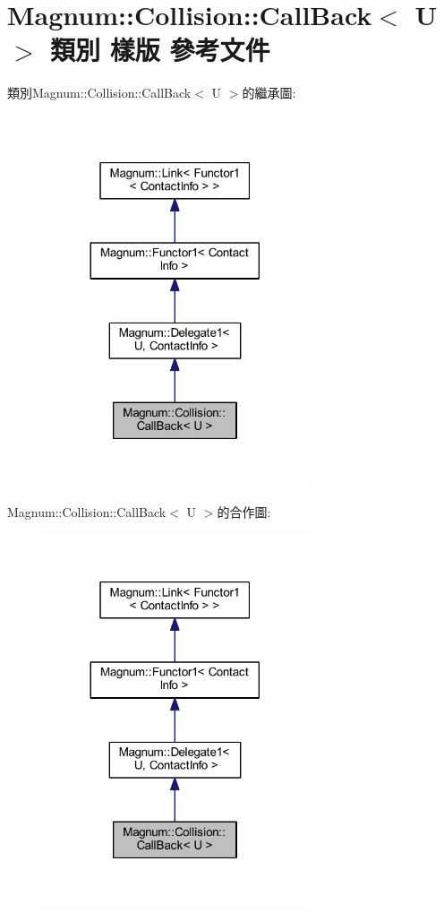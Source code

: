 \hypertarget{class_magnum_1_1_collision_1_1_call_back}{}\section{Magnum\+:\+:Collision\+:\+:Call\+Back$<$ U $>$ 類別 樣版 參考文件}
\label{class_magnum_1_1_collision_1_1_call_back}


類別\+Magnum\+:\+:Collision\+:\+:Call\+Back$<$ U $>$的繼承圖\+:\nopagebreak
\begin{figure}[H]
\begin{center}
\leavevmode
\includegraphics[width=221pt]{class_magnum_1_1_collision_1_1_call_back__inherit__graph}
\end{center}
\end{figure}


Magnum\+:\+:Collision\+:\+:Call\+Back$<$ U $>$的合作圖\+:\nopagebreak
\begin{figure}[H]
\begin{center}
\leavevmode
\includegraphics[width=221pt]{class_magnum_1_1_collision_1_1_call_back__coll__graph}
\end{center}
\end{figure}
